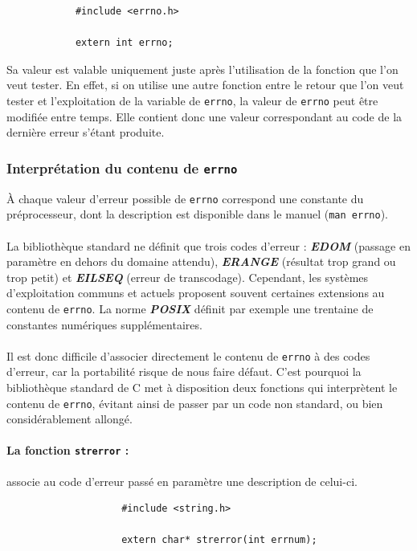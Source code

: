 		\begin{lstlisting}
			#include <errno.h>

			extern int errno;
		\end{lstlisting}
		
		Sa valeur est valable uniquement juste après l'utilisation de la fonction que l'on veut tester. En effet, si on utilise une autre fonction entre le retour que l'on veut tester et l'exploitation de la variable de \lstinline!errno!, la valeur de \lstinline!errno! peut être modifiée entre temps. Elle contient donc une valeur correspondant au code de la dernière erreur s'étant produite.
		
		\subsubsection*{Interprétation du contenu de \lstinline!errno!}
			À chaque valeur d'erreur possible de \lstinline!errno! correspond une constante du préprocesseur, dont la description est disponible dans le manuel (\lstinline!man errno!).
			
			\paragraph{} La bibliothèque standard ne définit que trois codes d'erreur : \textbf{\textit{EDOM}} (passage en paramètre en dehors du domaine attendu), \textbf{\textit{ERANGE}} (résultat trop grand ou trop petit) et \textbf{\textit{EILSEQ}} (erreur de transcodage). Cependant, les systèmes d'exploitation communs et actuels proposent souvent certaines extensions au contenu de \lstinline!errno!. La norme \textbf{\textit{POSIX}} définit par exemple une trentaine de constantes numériques supplémentaires.
			
			\paragraph{} Il est donc difficile d'associer directement le contenu de \lstinline!errno! à des codes d'erreur, car la portabilité risque de nous faire défaut. C'est pourquoi la bibliothèque standard de C met à disposition deux fonctions qui interprètent le contenu de \lstinline!errno!, évitant ainsi de passer par un code non standard, ou bien considérablement allongé.
			
			\paragraph{La fonction \lstinline!strerror! :} associe au code d'erreur passé en paramètre une description de celui-ci.
				\begin{lstlisting}
					#include <string.h>
					
					extern char* strerror(int errnum);
				\end{lstlisting}
			
